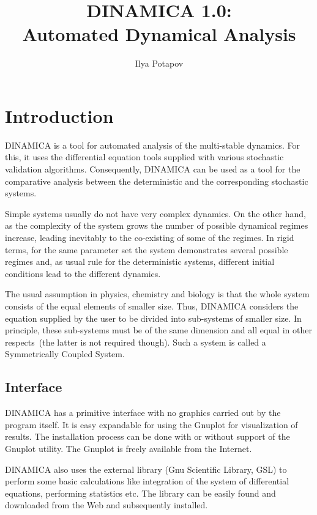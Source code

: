\documentclass[11pt,a4paper]{article}
\title{DINAMICA 1.0:\\Automated Dynamical Analysis}
\author{Ilya Potapov}
\date{}
\begin{document}
\maketitle{}

\newpage{}

\tableofcontents

\newpage{}

\section{Introduction}
\label{sec:introduction}

DINAMICA is a tool for automated analysis of the multi-stable dynamics. For this, it
uses the differential equation tools supplied with various stochastic validation
algorithms. Consequently, DINAMICA can be used as a tool for the comparative analysis
between the deterministic and the corresponding stochastic systems.

Simple systems usually do not have very complex dynamics. On the other hand, as the
complexity of the system grows the number of possible dynamical regimes increase,
leading inevitably to the co-existing of some of the regimes. In rigid terms, for the
same parameter set the system demonstrates several possible regimes and, as usual
rule for the deterministic systems, different initial conditions lead to the
different dynamics.

The usual assumption in physics, chemistry and biology is that the whole system
consists of the equal elements of smaller size. Thus, DINAMICA considers the equation
supplied by the user to be divided into sub-systems of smaller size. In principle,
these sub-systems must be of the same dimension and all equal in other respects~(the
latter is not required though). Such a system is called a Symmetrically Coupled
System.

\subsection{Interface}
\label{sec:interface}

DINAMICA has a primitive interface with no graphics carried out by the program
itself. It is easy expandable for using the Gnuplot for visualization of results. The
installation process can be done with or without support of the Gnuplot utility. The
Gnuplot is freely available from the Internet.

DINAMICA also uses the external library (Gnu Scientific Library, GSL) to perform some
basic calculations like integration of the system of differential equations,
performing statistics etc. The library can be easily found and downloaded from the
Web and subsequently installed.
\end{document}
